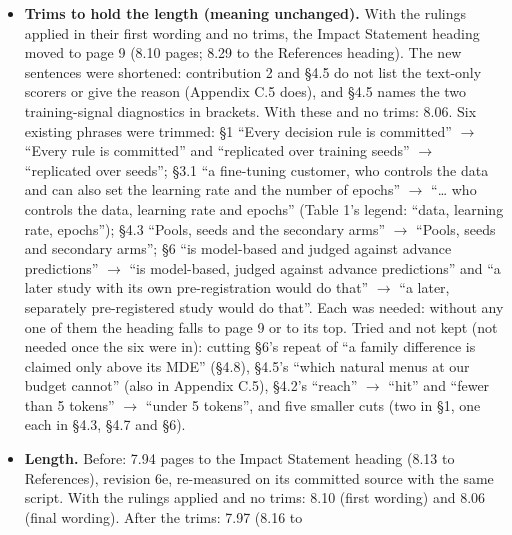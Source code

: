 \documentclass{article}
\theoremstyle{plain}
\theoremstyle{definition}
\theoremstyle{remark}
\begin{document}
\begin{itemize}
        pre-registered repairs'' and \S{}4.6's ``about 10--12~pp''. The sources
        do not settle them: LW-26, at its default, puts ``pre-specified'' in the
        W1 record and names no paper text (risk 34); no FOCUS entry after
        fcf79a2 (8dac6ad, 00b99a4, 71f2458, 1423a4c) touches either; \S{}4.6's
        range comes from Gate B's frozen operating characteristics.
  \item \textbf{Trims to hold the length (meaning unchanged).} With the rulings
        applied in their first wording and no trims, the Impact Statement
        heading moved to page 9 (8.10 pages; 8.29 to the References heading).
        The new sentences were shortened: contribution 2 and \S{}4.5 do not list
        the text-only scorers or give the reason (Appendix C.5 does), and
        \S{}4.5 names the two training-signal diagnostics in brackets. With
        these and no trims: 8.06. Six existing phrases were trimmed: \S{}1
        ``Every decision rule is committed'' $\to$ ``Every rule is committed''
        and ``replicated over training seeds'' $\to$ ``replicated over seeds'';
        \S{}3.1 ``a fine-tuning customer, who controls the data and can also set
        the learning rate and the number of epochs'' $\to$ ``\ldots{} who
        controls the data, learning rate and epochs'' (Table 1's legend: ``data,
        learning rate, epochs''); \S{}4.3 ``Pools, seeds and the secondary
        arms'' $\to$ ``Pools, seeds and secondary arms''; \S{}6 ``is model-based
        and judged against advance predictions'' $\to$ ``is model-based, judged
        against advance predictions'' and ``a later study with its own
        pre-registration would do that'' $\to$ ``a later, separately
        pre-registered study would do that''. Each was needed: without any one
        of them the heading falls to page 9 or to its top. Tried and not kept
        (not needed once the six were in): cutting \S{}6's repeat of ``a family
        difference is claimed only above its MDE'' (\S{}4.8), \S{}4.5's ``which
        natural menus at our budget cannot'' (also in Appendix C.5), \S{}4.2's
        ``reach'' $\to$ ``hit'' and ``fewer than 5 tokens'' $\to$ ``under 5
        tokens'', and five smaller cuts (two in \S{}1, one each in \S{}4.3,
        \S{}4.7 and \S{}6).
  \item \textbf{Length.} Before: 7.94 pages to the Impact Statement heading
        (8.13 to References), revision 6e, re-measured on its committed source
        with the same script. With the rulings applied and no trims: 8.10 (first
        wording) and 8.06 (final wording). After the trims: 7.97 (8.16 to

\end{itemize}
\end{document}
